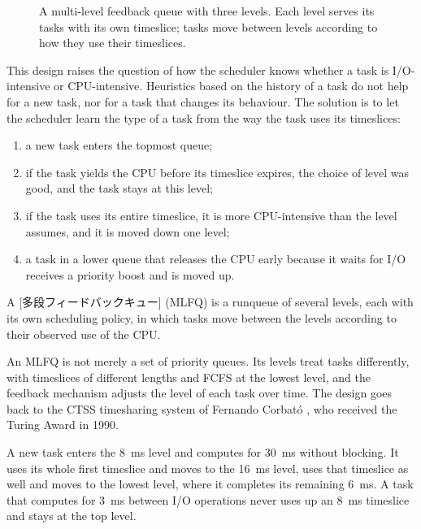 \documentclass[../main.tex]{subfiles}
\begin{document}
\begin{figure}[htbp]
  \centering
  
  \caption{A multi-level feedback queue with three levels.  Each level
    serves its tasks with its own timeslice; tasks move between levels
    according to how they use their timeslices.}
  \label{fig:l07-mlfq}
\end{figure}

This design raises the question of how the scheduler knows whether a task
is I/O-intensive or CPU-intensive.  Heuristics based on the history of a
task do not help for a new task, nor for a task that changes its behaviour.
The solution is to let the scheduler learn the type of a task from the way
the task uses its timeslices:
\begin{enumerate}
  \item a new task enters the topmost queue;
  \item if the task yields the CPU before its timeslice expires, the choice
    of level was good, and the task stays at this level;
  \item if the task uses its entire timeslice, it is more CPU-intensive than
    the level assumes, and it is moved down one level;
  \item a task in a lower queue that releases the CPU early because it
    waits for I/O receives a priority boost and is moved up.
\end{enumerate}

\begin{definition}
  A [多段フィードバックキュー]%
   (MLFQ) is a runqueue of
  several levels, each with its own scheduling policy, in which tasks move
  between the levels according to their observed use of the CPU.
\end{definition}

An MLFQ is not merely a set of priority queues.  Its levels treat tasks
differently, with timeslices of different lengths and FCFS at the lowest
level, and the feedback mechanism adjusts the level of each task over time.
The design goes back to the CTSS timesharing system of Fernando
Corbató \cite{corbato1962}, who received the Turing Award in 1990.

\begin{example}
  A new task enters the \SI{8}{\milli\second} level and computes for
  \SI{30}{\milli\second} without blocking.  It uses its whole first
  timeslice and moves to the \SI{16}{\milli\second} level, uses that
  timeslice as well and moves to the lowest level, where it completes its
  remaining \SI{6}{\milli\second}.  A task that computes for
  \SI{3}{\milli\second} between I/O operations never uses up an
  \SI{8}{\milli\second} timeslice and stays at the top level.
\end{example}
\end{document}
